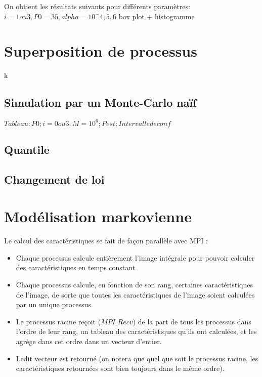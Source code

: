 \documentclass[a4paper,11pt]{article}
\begin{document}
On obtient les résultats suivants pour différents paramètres:
$i=1 ou 3, P0=35, alpha=10^-4, 5, 6	
$ box plot + histogramme

\section{Superposition de processus}
k



\subsection{Simulation par un Monte-Carlo naïf}
$Tableau: P0; i=0 ou 3 ;M=10^6; Pest; Intervalle de conf
$

\subsection{Quantile}

\subsection{Changement de loi}

\section{Modélisation markovienne}




Le calcul des caractéristiques se fait de façon parallèle avec MPI :\\

\begin{itemize}
	\item Chaque processus calcule entièrement l’image intégrale pour pouvoir calculer des caractéristiques en temps constant. \\
	\item Chaque processus calcule, en fonction de son rang, certaines caractéristiques de l’image, de sorte que toutes les caractéristiques de l’image soient calculées par un unique processus. \\
	\item Le processus racine reçoit ($MPI\_Recv$) de la part de tous les processus dans l’ordre de leur rang, un tableau des caractéristiques qu’ils ont calculées, et les agrège dans cet ordre dans un vecteur d’entier.\\
	\item Ledit vecteur est retourné (on notera que quel que soit le processus racine, les caractéristiques retournées sont bien toujours dans le même ordre).\\
\end{itemize}
\end{document}
